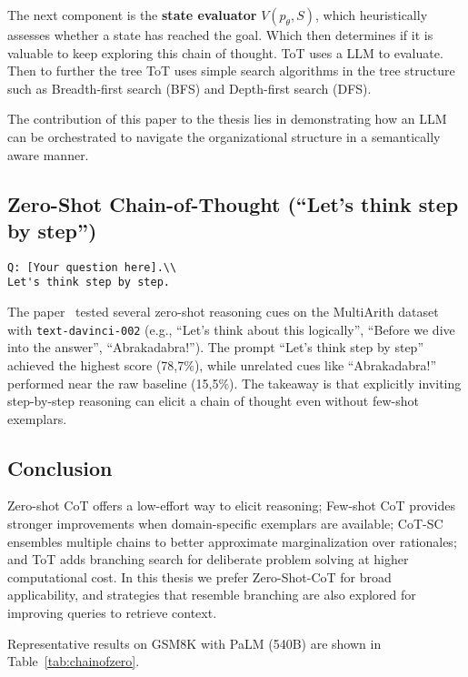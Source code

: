 The next component is the \textbf{state evaluator} $V(p_\theta,S)$, which heuristically assesses whether a state has reached the goal. Which then determines if it is valuable to keep exploring this chain of thought. ToT \cite{chainofthought} uses a \gls{LLM} to evaluate.
Then to further the tree ToT uses simple search algorithms in the tree structure such as Breadth-first search (BFS) and Depth-first search (DFS).

The contribution of this paper to the thesis lies in demonstrating how an \gls{LLM} can be orchestrated to navigate the organizational structure in a semantically aware manner.

\subsection{Zero-Shot Chain-of-Thought (``Let's think step by step'')~\cite{chainofzero}}
\begin{lstlisting}[language={},basicstyle=\ttfamily\footnotesize,caption={Zero-Shot Chain-of-Thought Prompt Template}]
Q: [Your question here].\\
Let's think step by step.
\end{lstlisting}

The paper~\cite{chainofzero} tested several zero-shot reasoning cues on the MultiArith dataset with \texttt{text-davinci-002} (e.g., ``Let's think about this logically'', ``Before we dive into the answer'', ``Abrakadabra!''). The prompt ``Let's think step by step'' achieved the highest score (78,7\%), while unrelated cues like ``Abrakadabra!'' performed near the raw baseline (15,5\%). The takeaway is that explicitly inviting step-by-step reasoning can elicit a chain of thought even without few-shot exemplars.

\subsection{Conclusion}
Zero-shot CoT offers a low-effort way to elicit reasoning; Few-shot CoT provides stronger improvements when domain-specific exemplars are available; CoT-SC ensembles multiple chains to better approximate marginalization over rationales; and ToT adds branching search for deliberate problem solving at higher computational cost. In this thesis we prefer Zero-Shot-CoT for broad applicability, and strategies that resemble branching are also explored for improving queries to retrieve context.

Representative results on GSM8K with PaLM (540B) are shown in Table~\ref{tab:chainofzero}.

